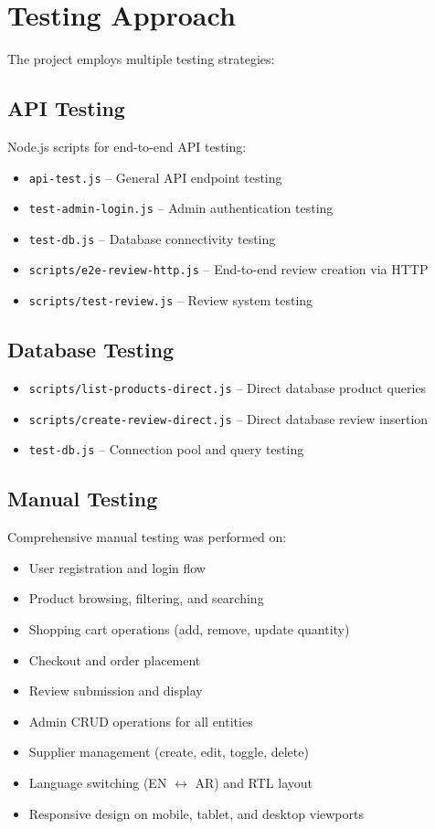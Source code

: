 \documentclass[12pt,a4paper]{report}
\begin{document}
\section{Testing Approach}
The project employs multiple testing strategies:

\subsection{API Testing}
Node.js scripts for end-to-end API testing:
\begin{itemize}[noitemsep]
  \item \texttt{api-test.js} -- General API endpoint testing
  \item \texttt{test-admin-login.js} -- Admin authentication testing
  \item \texttt{test-db.js} -- Database connectivity testing
  \item \texttt{scripts/e2e-review-http.js} -- End-to-end review creation via HTTP
  \item \texttt{scripts/test-review.js} -- Review system testing
\end{itemize}

\subsection{Database Testing}
\begin{itemize}[noitemsep]
  \item \texttt{scripts/list-products-direct.js} -- Direct database product queries
  \item \texttt{scripts/create-review-direct.js} -- Direct database review insertion
  \item \texttt{test-db.js} -- Connection pool and query testing
\end{itemize}

\subsection{Manual Testing}
Comprehensive manual testing was performed on:
\begin{itemize}[noitemsep]
  \item User registration and login flow
  \item Product browsing, filtering, and searching
  \item Shopping cart operations (add, remove, update quantity)
  \item Checkout and order placement
  \item Review submission and display
  \item Admin CRUD operations for all entities
  \item Supplier management (create, edit, toggle, delete)
  \item Language switching (EN $\leftrightarrow$ AR) and RTL layout
  \item Responsive design on mobile, tablet, and desktop viewports
\end{itemize}
\end{document}
